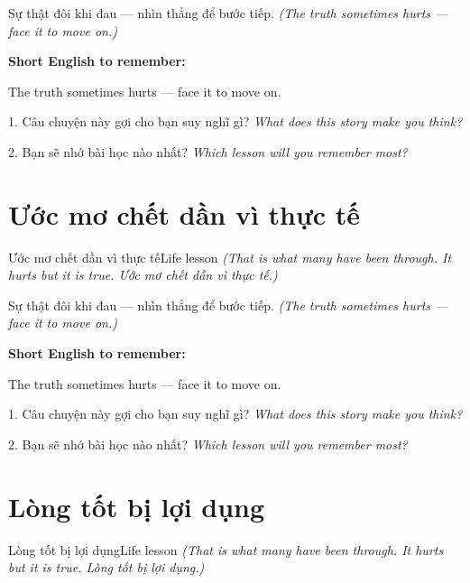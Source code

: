 \begin{baihoc}
Sự thật đôi khi đau — nhìn thẳng để bước tiếp.
\textit{(The truth sometimes hurts — face it to move on.)}
\end{baihoc}

\begin{ghinhoanh}
\textbf{Short English to remember:}

The truth sometimes hurts — face it to move on.

\end{ghinhoanh}

\begin{tuhocnhanh}
1. Câu chuyện này gợi cho bạn suy nghĩ gì? \textit{What does this story make you think?}

2. Bạn sẽ nhớ bài học nào nhất? \textit{Which lesson will you remember most?}
\end{tuhocnhanh}
\ngancach


\section{Ước mơ chết dần vì thực tế}
\begin{truyen}{Ước mơ chết dần vì thực tế}{Life lesson}
\textit{(That is what many have been through. It hurts but it is true. Ước mơ chết dần vì thực tế.)}
\end{truyen}

\begin{baihoc}
Sự thật đôi khi đau — nhìn thẳng để bước tiếp.
\textit{(The truth sometimes hurts — face it to move on.)}
\end{baihoc}

\begin{ghinhoanh}
\textbf{Short English to remember:}

The truth sometimes hurts — face it to move on.

\end{ghinhoanh}

\begin{tuhocnhanh}
1. Câu chuyện này gợi cho bạn suy nghĩ gì? \textit{What does this story make you think?}

2. Bạn sẽ nhớ bài học nào nhất? \textit{Which lesson will you remember most?}
\end{tuhocnhanh}
\ngancach


\section{Lòng tốt bị lợi dụng}
\begin{truyen}{Lòng tốt bị lợi dụng}{Life lesson}
\textit{(That is what many have been through. It hurts but it is true. Lòng tốt bị lợi dụng.)}
\end{truyen}

